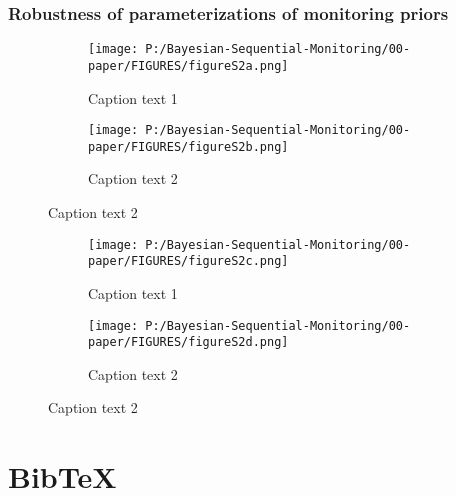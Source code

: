 \documentclass[12pt]{article}
\begin{document}
\subsubsection{Robustness of parameterizations of monitoring priors}
\begin{figure}
  \begin{subfigure}{7in}
    \centering\texttt{[image: P:/Bayesian-Sequential-Monitoring/00-paper/FIGURES/figureS2a.png]}
    \caption{Caption text 1}
  \end{subfigure}
  \begin{subfigure}{7in}
    \centering\texttt{[image: P:/Bayesian-Sequential-Monitoring/00-paper/FIGURES/figureS2b.png]}
    \caption{Caption text 2}
  \end{subfigure}
 \end{figure}
\begin{figure}
  \begin{subfigure}{7in}
    \centering\texttt{[image: P:/Bayesian-Sequential-Monitoring/00-paper/FIGURES/figureS2c.png]}
    \caption{Caption text 1}
  \end{subfigure}
  \begin{subfigure}{7in}
    \centering\texttt{[image: P:/Bayesian-Sequential-Monitoring/00-paper/FIGURES/figureS2d.png]}
    \caption{Caption text 2}
  \end{subfigure}
\end{figure}

\section{BibTeX}

 
 		
\end{document}
